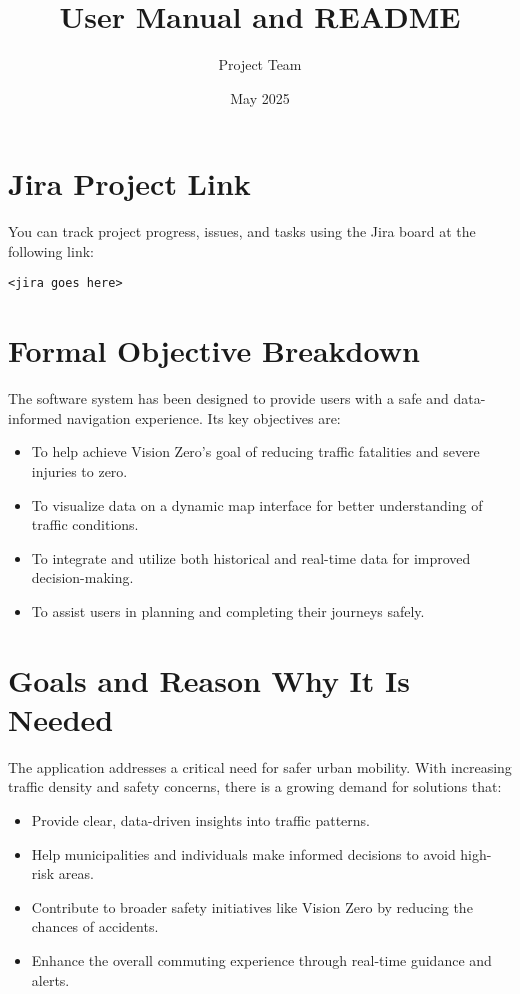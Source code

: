 \documentclass{article}
\title{User Manual and README}
\author{Project Team}
\date{May 2025}
\begin{document}
\maketitle

\section{Jira Project Link}
You can track project progress, issues, and tasks using the Jira board at the following link:
\begin{verbatim}
<jira goes here>
\end{verbatim}

\section{Formal Objective Breakdown}
The software system has been designed to provide users with a safe and data-informed navigation experience. Its key objectives are:
\begin{itemize}
    \item To help achieve Vision Zero's goal of reducing traffic fatalities and severe injuries to zero.
    \item To visualize data on a dynamic map interface for better understanding of traffic conditions.
    \item To integrate and utilize both historical and real-time data for improved decision-making.
    \item To assist users in planning and completing their journeys safely.
\end{itemize}



\section{Goals and Reason Why It Is Needed}
The application addresses a critical need for safer urban mobility. With increasing traffic density and safety concerns, there is a growing demand for solutions that:
\begin{itemize}
    \item Provide clear, data-driven insights into traffic patterns.
    \item Help municipalities and individuals make informed decisions to avoid high-risk areas.
    \item Contribute to broader safety initiatives like Vision Zero by reducing the chances of accidents.
    \item Enhance the overall commuting experience through real-time guidance and alerts.
\end{itemize}
\end{document}
